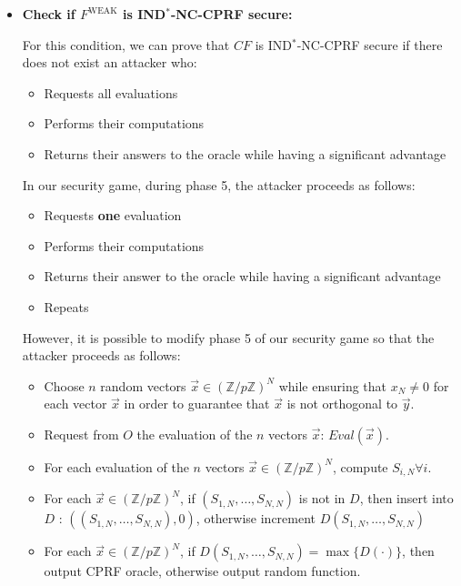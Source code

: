 \documentclass[9pt]{extarticle}
\begin{document}
\begin{itemize}
We say that $P$ is non-programmable if $P.Prog$ does not update $\sigma_P$ and the execution of $P.Ls$ on different inputs does not change the distribution of its output.

In our implementation of $F^{\text{WEAK}}$, we use lazy sampling to implement the hash function $H$. This implies that $Eval_H(\vec{x}) = H(S \cdot \vec{x})$ is fixed only when the evaluation of $\vec{x}$ is requested, but not earlier.

We can therefore conclude that $P$ is non-programmable.

\item \textbf{Check if $F^{\text{WEAK}}$ is IND$^*$-NC-CPRF secure:}

For this condition, we can prove that $CF$ is IND$^*$-NC-CPRF secure if there does not exist an attacker who:

\begin{itemize}
  \item Requests all evaluations
  \item Performs their computations
  \item Returns their answers to the oracle while having a significant advantage
\end{itemize}

In our security game, during phase 5, the attacker proceeds as follows: 

\begin{itemize}
  \item Requests \textbf{one} evaluation
  \item Performs their computations
  \item Returns their answer to the oracle while having a significant advantage
  \item Repeats
\end{itemize}

However, it is possible to modify phase 5 of our security game so that the attacker proceeds as follows: 

\begin{itemize}
  \item Choose $n$ random vectors $\vec{x} \in (\mathbb{Z}/p\mathbb{Z})^N$ while ensuring that $x_N \neq 0$ for each vector $\vec{x}$ in order to guarantee that $\vec{x}$ is not orthogonal to $\vec{y}$.
  \item Request from $O$ the evaluation of the $n$ vectors $\vec{x}$: $Eval(\vec{x})$.
  \item For each evaluation of the $n$ vectors $\vec{x} \in (\mathbb{Z}/p\mathbb{Z})^N$, compute $S_{i,N} \forall i$.
  \item For each $\vec{x} \in (\mathbb{Z}/p\mathbb{Z})^N$, if $(S_{1,N},\ldots,S_{N,N})$ is not in $D$, then insert into $D$ : $( (S_{1,N},\ldots,S_{N,N}), 0)$, otherwise increment $D(S_{1,N},\ldots,S_{N,N})$
  \item For each $\vec{x} \in (\mathbb{Z}/p\mathbb{Z})^N$, if $D(S_{1,N},\ldots,S_{N,N}) = \max\{D(\cdot)\}$, then output CPRF oracle, otherwise output random function.
\end{itemize}


\end{itemize}
\end{document}
